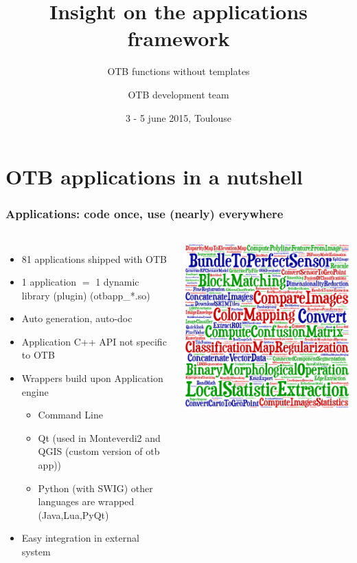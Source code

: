 \documentclass[8pt]{beamer}
\title{ Insight on the applications framework}
\subtitle{OTB functions without templates}
\author{OTB development team}%
\date{3 - 5 june 2015, Toulouse}
\begin{document}
\begin{frame}
\titlepage
\end{frame}

\section{OTB applications in a nutshell}

\begin{frame}
\frametitle{Applications: code once, use (nearly) everywhere}
\begin{columns}
\begin{itemize}
\item 81 applications shipped with OTB
\item 1 application $=$ 1 dynamic library (plugin) (otbapp\_*.so)
\item Auto generation, auto-doc
\item Application C++ API not specific to OTB
\item Wrappers build upon Application engine
\begin{itemize}
\item Command Line
\item Qt (used in Monteverdi2 and QGIS (custom version of otb app))
\item Python (with SWIG) other languages are wrapped (Java,Lua,PyQt) 
\end{itemize}
\item Easy integration in external system 
\end{itemize}
\includegraphics[width=\textwidth]{images/cloud_applications}
\end{columns}
\end{frame}
\end{document}
